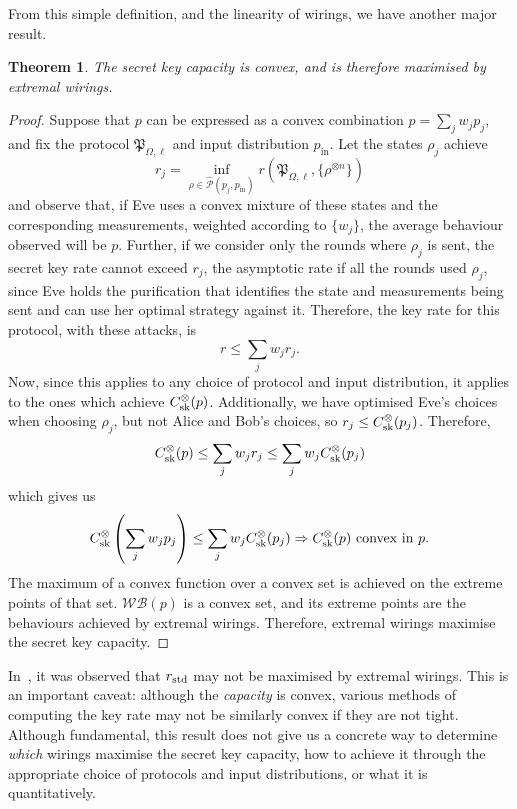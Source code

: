 \documentclass[10pt, a4paper]{article}
\numberwithin{equation}{section} %
\newcounter{stmt} %
\theoremstyle{definition}
\theoremstyle{plain}
\newtheorem{theorem}[stmt]{Theorem}
\newcommand{\?}{\mathrel{?}} %
\newcommand{\sWB}{\mathcal{WB}}
\newcommand{\compatstates}[3][]{\hat{\mathcal{P}}#1(#2,#3)}
\newcommand{\proto}[2][_{\Omega,\ell}]{\mathfrak{#2}#1}
\newcommand{\prin}[1][p]{#1_{\mathrm{in}}}
\newcommand{\sk}{\rm sk}
\newcommand{\std}{\rm std}
\begin{document}
                  From this simple definition, and the linearity of wirings, we have another major result.
                  \begin{theorem}\label{thm:extrcap}
                    The secret key capacity is convex, and is therefore maximised by extremal wirings.
                  \end{theorem}
                  \begin{proof}
                    Suppose that \(p\) can be expressed as a convex combination \(p = \sum_j w_j p_j\), and fix the protocol \(\proto{P}\) and input distribution \(\prin\). Let the states \(\rho_j\) achieve
                    \[ r_j = \inf_{\rho \in \compatstates{p_j}{\prin}} r\left(\proto{P}, \{\rho^{\otimes n}\} \right) \]
                    and observe that, if Eve uses a convex mixture of these states and the corresponding measurements, weighted according to \(\{w_j\}\), the average behaviour observed will be \(p\). Further, if we consider only the rounds where \(\rho_j\) is sent, the secret key rate cannot exceed \(r_j\), the asymptotic rate if all the rounds used \(\rho_j\), since Eve holds the purification that identifies the state and measurements being sent and can use her optimal strategy against it. Therefore, the key rate for this protocol, with these attacks, is
                    \[ r \leq \sum_j w_j r_j. \]
                    Now, since this applies to any choice of protocol and input distribution, it applies to the ones which achieve \(C_{\sk}^{\otimes}(p)\). Additionally, we have optimised Eve's choices when choosing \(\rho_j\), but not Alice and Bob's choices, so \(r_j \leq C_{\sk}^{\otimes}(p_j)\). Therefore,
                    \[ C_{\sk}^{\otimes}(p) \leq \sum_j w_j r_j \leq \sum_j w_j C_{\sk}^{\otimes}(p_j) \]
                    which gives us
                  \begin{equation}
                    C_{\sk}^{\otimes}\left(\sum_j w_j p_j\right) \leq \sum_j w_j C_{\sk}^{\otimes}(p_j) \Rightarrow C_{\sk}^{\otimes}(p)\text{ convex in }p.
                  \end{equation}
                  The maximum of a convex function over a convex set is achieved on the extreme points of that set. \(\sWB(p)\) is a convex set, and its extreme points are the behaviours achieved by extremal wirings. Therefore, extremal wirings maximise the secret key capacity.
                  \end{proof}

                  In~\cite{JanLiThesis}, it was observed that \(r_{\std}\) may not be maximised by extremal wirings. This is an important caveat: although the \emph{capacity} is convex, various methods of computing the key rate may not be similarly convex if they are not tight. Although fundamental, this result does not give us a concrete way to determine \emph{which} wirings maximise the secret key capacity, how to achieve it through the appropriate choice of protocols and input distributions, or what it is quantitatively.
\end{document}
